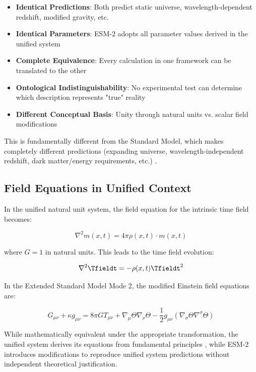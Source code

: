 	\begin{itemize}
		\item \textbf{Identical Predictions}: Both predict static universe, wavelength-dependent redshift, modified gravity, etc.
		\item \textbf{Identical Parameters}: ESM-2 adopts all parameter values derived in the unified system
		\item \textbf{Complete Equivalence}: Every calculation in one framework can be translated to the other
		\item \textbf{Ontological Indistinguishability}: No experimental test can determine which description represents "true" reality \cite{vanFraassen1980}
		\item \textbf{Different Conceptual Basis}: Unity through natural units vs. scalar field modifications
	\end{itemize}
	
	This is fundamentally different from the Standard Model, which makes completely different predictions (expanding universe, wavelength-independent redshift, dark matter/energy requirements, etc.) \cite{Riess1998,McGaugh2016}.
	
	\subsection{Field Equations in Unified Context}
	\label{subsec:field_equations_unified}
	
	In the unified natural unit system, the field equation for the intrinsic time field becomes:
	
	\begin{equation}
		\nabla^2 m(x,t) = 4\pi \rho(x,t) \cdot m(x,t)
	\end{equation}
	
	where $G = 1$ in natural units. This leads to the time field evolution:
	
	\begin{equation}
		\nabla^2 \Tfieldt = -\rho(x,t) \Tfieldt^2
	\end{equation}
	
	In the Extended Standard Model Mode 2, the modified Einstein field equations are:
	
	\begin{equation}
		G_{\mu\nu} + \kappa g_{\mu\nu} = 8\pi G T_{\mu\nu} + \nabla_{\mu}\Theta\nabla_{\nu}\Theta - \frac{1}{2}g_{\mu\nu}(\nabla_{\sigma}\Theta\nabla^{\sigma}\Theta)
	\end{equation}
	
	While mathematically equivalent under the appropriate transformation, the unified system derives its equations from fundamental principles \cite{pascher_lagrangian_2025}, while ESM-2 introduces modifications to reproduce unified system predictions without independent theoretical justification.
	
